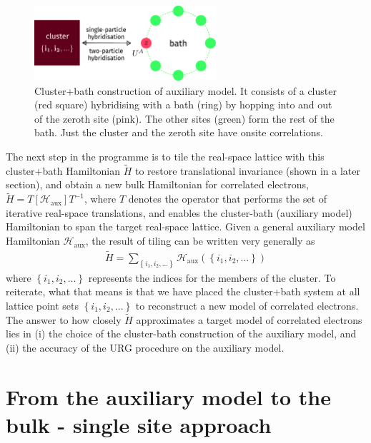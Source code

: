 \documentclass{report}
\numberwithin{equation}{section}
\begin{document}
\begin{figure}[!htb]
 	\centering
 	\includegraphics[width=0.6\textwidth]{../figures/gen_siam.pdf}
 	\caption{Cluster+bath construction of auxiliary model. It consists of a cluster (red square) hybridising with a bath (ring) by hopping into and out of the zeroth site (pink). The other sites (green) form the rest of the bath. Just the cluster and the zeroth site have onsite correlations.}
 \end{figure}
 The next step in the programme is to tile the real-space lattice with this cluster+bath Hamiltonian \(\tilde H\) to restore translational invariance (shown in a later section), and obtain a new bulk Hamiltonian for correlated electrons, $\tilde H = T\left[ \mathcal{H}_\text{aux} \right] T^{-1}$, where $T$ denotes the operator that performs the set of iterative real-space translations, and enables the cluster-bath (auxiliary model) Hamiltonian to span the target real-space lattice. Given a general auxiliary model Hamiltonian \(\mathcal{H}_\text{aux}\), the result of tiling can be written very generally as
 \begin{equation}\begin{aligned}
	 \tilde H = \sum_{\left\{i_1,i_2,...\right\}} \mathcal{H}_\text{aux}\left(\left\{i_1,i_2,...\right\}\right)
 \end{aligned}\end{equation}
where \(\left\{i_1,i_2,...\right\}\) represents the indices for the members of the cluster. To reiterate, what that means is that we have placed the cluster+bath system at all lattice point sets \(\left\{i_1,i_2,...\right\}\) to reconstruct a new model of correlated electrons. The answer to how closely $\tilde H$ approximates a target model of correlated electrons lies in (i) the choice of the cluster-bath construction of the auxiliary model, and (ii) the accuracy of the URG procedure on the auxiliary model. 

\chapter{From the auxiliary model to the bulk - single site approach}
\label{chap:tile}
\end{document}
